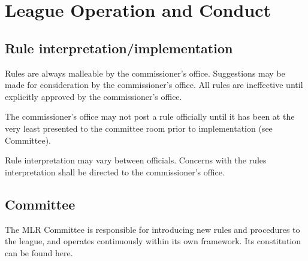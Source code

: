 
\section{League Operation and Conduct}

\subsection{Rule interpretation/implementation}
\begin{deepEnumerate}
	\item Rules are always malleable by the commissioner's office.
	Suggestions may be made for consideration by the commissioner's office.
	All rules are ineffective until explicitly approved by the commissioner's office.
	\item The commissioner’s office may not post a rule officially 
	until it has been at the very least presented to the committee room 
	prior to implementation (see Committee). %
	\item Rule interpretation may vary between officials.
	Concerns with the rules interpretation shall be directed to the commissioner’s office.
\end{deepEnumerate}

\subsection{Committee}
\begin{deepEnumerate}
	\item The MLR Committee is responsible for introducing new rules and procedures to the league,
	and operates continuously within its own framework.
	Its constitution can be found here. %
\end{deepEnumerate}

